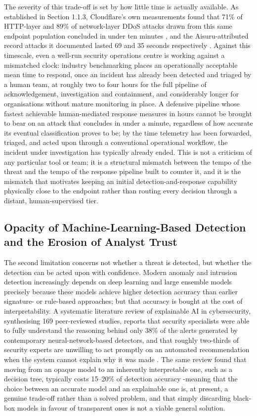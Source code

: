The severity of this trade-off is set by how little time is actually available. As established in Section 1.1.3, Cloudflare's own measurements found that 71\% of HTTP-layer and 89\% of network-layer DDoS attacks drawn from this same endpoint population concluded in under ten minutes \cite{Cloudflare2025Q3}, and the Aisuru-attributed record attacks it documented lasted 69 and 35 seconds respectively \cite{Cloudflare2025Q3, Cloudflare2026Q4}. Against this timescale, even a well-run security operations centre is working against a mismatched clock: industry benchmarking places an operationally acceptable mean time to respond, once an incident has already been detected and triaged by a human team, at roughly two to four hours for the full pipeline of acknowledgement, investigation and containment, and considerably longer for organisations without mature monitoring in place. A defensive pipeline whose fastest achievable human-mediated response measures in hours cannot be brought to bear on an attack that concludes in under a minute, regardless of how accurate its eventual classification proves to be; by the time telemetry has been forwarded, triaged, and acted upon through a conventional operational workflow, the incident under investigation has typically already ended. This is not a criticism of any particular tool or team; it is a structural mismatch between the tempo of the threat and the tempo of the response pipeline built to counter it, and it is the mismatch that motivates keeping an initial detection-and-response capability physically close to the endpoint rather than routing every decision through a distant, human-supervised tier.

\subsection{Opacity of Machine-Learning-Based Detection and the Erosion of Analyst Trust}

The second limitation concerns not whether a threat is detected, but whether the detection can be acted upon with confidence. Modern anomaly and intrusion detection increasingly depends on deep learning and large ensemble models precisely because these models achieve higher detection accuracy than earlier signature- or rule-based approaches; but that accuracy is bought at the cost of interpretability. A systematic literature review of explainable AI in cybersecurity, synthesising 169 peer-reviewed studies, reports that security specialists were able to fully understand the reasoning behind only 38\% of the alerts generated by contemporary neural-network-based detectors, and that roughly two-thirds of security experts are unwilling to act promptly on an automated recommendation when the system cannot explain why it was made \cite{Oriaro2025}. The same review found that moving from an opaque model to an inherently interpretable one, such as a decision tree, typically costs 15--20\% of detection accuracy \cite{Oriaro2025}-meaning that the choice between an accurate model and an explainable one is, at present, a genuine trade-off rather than a solved problem, and that simply discarding black-box models in favour of transparent ones is not a viable general solution.

